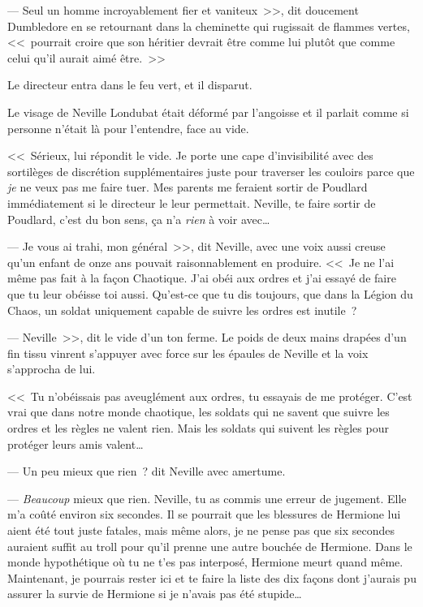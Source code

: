 --- Seul un homme incroyablement fier et vaniteux~>>, dit doucement Dumbledore en se retournant dans la cheminette qui rugissait de flammes vertes, <<~pourrait croire que son héritier devrait être comme lui plutôt que comme celui qu'il aurait aimé être.~>>

Le directeur entra dans le feu vert, et il disparut.


Le visage de Neville Londubat était déformé par l'angoisse et il parlait comme si personne n'était là pour l'entendre, face au vide.

<<~Sérieux, lui répondit le vide. Je porte une cape d'invisibilité avec des sortilèges de discrétion supplémentaires juste pour traverser les couloirs parce que \emph{je} ne veux pas me faire tuer. Mes parents me feraient sortir de Poudlard immédiatement si le directeur le leur permettait. Neville, te faire sortir de Poudlard, c'est du bon sens, ça n'a \emph{rien} à voir avec…

--- Je vous ai trahi, mon général~>>, dit Neville, avec une voix aussi creuse qu'un enfant de onze ans pouvait raisonnablement en produire. <<~Je ne l'ai même pas fait à la façon Chaotique. J'ai obéi aux ordres et j'ai essayé de faire que tu leur obéisse toi aussi. Qu'est-ce que tu dis toujours, que dans la Légion du Chaos, un soldat uniquement capable de suivre les ordres est inutile~?

--- Neville~>>, dit le vide d'un ton ferme. Le poids de deux mains drapées d'un fin tissu vinrent s'appuyer avec force sur les épaules de Neville et la voix s'approcha de lui.

<<~Tu n'obéissais pas aveuglément aux ordres, tu essayais de me protéger. C'est vrai que dans notre monde chaotique, les soldats qui ne savent que suivre les ordres et les règles ne valent rien. Mais les soldats qui suivent les règles pour protéger leurs amis valent…

--- Un peu mieux que rien~? dit Neville avec amertume.

--- \emph{Beaucoup} mieux que rien. Neville, tu as commis une erreur de jugement. Elle m'a coûté environ six secondes. Il se pourrait que les blessures de Hermione lui aient été tout juste fatales, mais même alors, je ne pense pas que six secondes auraient suffit au troll pour qu'il prenne une autre bouchée de Hermione. Dans le monde hypothétique où tu ne t'es pas interposé, Hermione meurt quand même. Maintenant, je pourrais rester ici et te faire la liste des dix façons dont j'aurais pu assurer la survie de Hermione si je n'avais pas été stupide…

